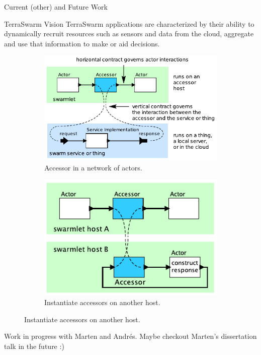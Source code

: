 \begin{frame}{Current (other) and Future Work}
  \footnotesize

  \vspace{1em}
  \begin{block}{TerraSwarm Vision}
    TerraSwarm applications are characterized by their ability to
    \alert{dynamically recruit} resources such as sensors and data from the
    cloud, aggregate and use that information to make or aid decisions.
  \end{block}

  \pause
  
  \begin{figure}
    \begin{subfigure}{0.49\textwidth}
      \centering
      \includegraphics[height=0.4\textheight]{figures/accessors.pdf}
      \caption{Accessor in a network of actors.}
    \end{subfigure}
    \hfill
    \begin{subfigure}{0.49\textwidth}
      \centering
      \includegraphics[height=0.4\textheight]{figures/accessors2.pdf}
      \caption{Instantiate accessors on another host.}
    \end{subfigure}
  \end{figure}

  \pause

  Work in progress with Marten and Andr\'es. Maybe checkout
  Marten's dissertation talk in the future :)
\end{frame}

